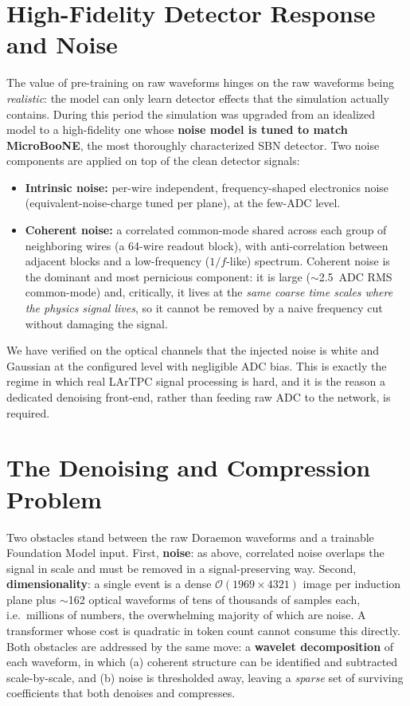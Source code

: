 \documentclass[11pt]{article}
\begin{document}
\section{High-Fidelity Detector Response and Noise}
The value of pre-training on raw waveforms hinges on the raw waveforms being
\emph{realistic}: the model can only learn detector effects that the simulation actually
contains. During this period the simulation was upgraded from an idealized model to a
high-fidelity one whose \textbf{noise model is tuned to match MicroBooNE}, the most
thoroughly characterized SBN detector. Two noise components are applied on top of the clean
detector signals:
\begin{itemize}\setlength{\itemsep}{2pt}
    \item \textbf{Intrinsic noise:} per-wire independent, frequency-shaped electronics
    noise (equivalent-noise-charge tuned per plane), at the few-ADC level.
    \item \textbf{Coherent noise:} a correlated common-mode shared across each group of
    neighboring wires (a 64-wire readout block), with anti-correlation between adjacent
    blocks and a low-frequency ($1/f$-like) spectrum. Coherent noise is the dominant and
    most pernicious component: it is large ($\sim$2.5~ADC RMS common-mode) and, critically,
    it lives at the \emph{same coarse time scales where the physics signal lives}, so it
    cannot be removed by a naive frequency cut without damaging the signal.
\end{itemize}
We have verified on the optical channels that the injected noise is white and Gaussian at the
configured level with negligible ADC bias. This is exactly the regime in which real LArTPC
signal processing is hard, and it is the reason a dedicated denoising front-end, rather than
feeding raw ADC to the network, is required.

\section{The Denoising and Compression Problem}
Two obstacles stand between the raw Doraemon waveforms and a trainable Foundation Model
input. First, \textbf{noise}: as above, correlated noise overlaps the signal in scale and
must be removed in a signal-preserving way. Second, \textbf{dimensionality}: a single event
is a dense $\mathcal{O}(1969\times4321)$ image per induction plane plus $\sim$162 optical
waveforms of tens of thousands of samples each, i.e.\ millions of numbers, the overwhelming
majority of which are noise. A transformer whose cost is quadratic in token count cannot
consume this directly. Both obstacles are addressed by the same move: a
\textbf{wavelet decomposition} of each waveform, in which (a) coherent structure can be
identified and subtracted scale-by-scale, and (b) noise is thresholded away, leaving a
\emph{sparse} set of surviving coefficients that both denoises and compresses.
\end{document}
